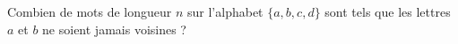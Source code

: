 Combien de mots de longueur $n$ sur l'alphabet $\{a, b, c, d\}$ sont tels que les lettres $a$ et $b$ ne soient jamais voisines ?

